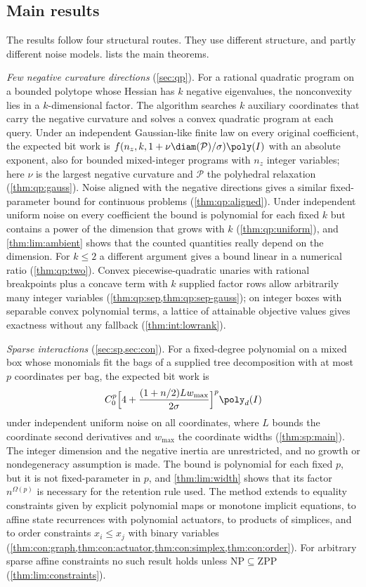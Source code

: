 \subsection{Main results}\label{sec:intro:results}

The results follow four structural routes. They use different structure,
and partly different noise models.  lists the main
theorems.

\emph{Few negative curvature directions} (\cref{sec:qp}). For a rational
quadratic program on a bounded polytope whose Hessian has $k$ negative
eigenvalues, the nonconvexity lies in a $k$-dimensional factor. The
algorithm searches $k$ auxiliary coordinates that carry the negative
curvature and solves a convex quadratic program at each query. Under an
independent Gaussian-like finite law on every original coefficient, the
expected bit work is $f(n_z,k,1+\nu\diam(\mathcal P)/\sigma)\poly(I)$ with an
absolute exponent, also for bounded mixed-integer programs with $n_z$
integer variables; here $\nu$ is the largest negative curvature and
$\mathcal P$ the polyhedral relaxation (\cref{thm:qp:gauss}). Noise aligned
with the negative directions gives a similar fixed-parameter bound for
continuous problems (\cref{thm:qp:aligned}). Under independent uniform noise
on every coefficient the bound is polynomial for each fixed $k$ but contains
a power of the dimension that grows with $k$ (\cref{thm:qp:uniform}), and
\cref{thm:lim:ambient} shows that the counted quantities really depend on
the dimension. For $k\le2$ a different argument gives a bound linear in a
numerical ratio (\cref{thm:qp:two}). Convex piecewise-quadratic unaries with
rational breakpoints plus a concave term with $k$ supplied factor rows allow
arbitrarily many integer variables
(\cref{thm:qp:sep,thm:qp:sep-gauss}); on integer boxes with separable convex
polynomial terms, a lattice of attainable objective values gives exactness
without any fallback (\cref{thm:int:lowrank}).

\emph{Sparse interactions} (\cref{sec:sp,sec:con}). For a fixed-degree
polynomial on a mixed box whose monomials fit the bags of a supplied tree
decomposition with at most $p$ coordinates per bag, the expected bit work is
\[
 C_0^p\Bigl[4+\frac{(1+n/2)Lw_{\max}}{2\sigma}\Bigr]^p\poly_d(I)
\]
under independent uniform noise on all coordinates, where $L$ bounds the
coordinate second derivatives and $w_{\max}$ the coordinate widths
(\cref{thm:sp:main}). The integer dimension and the negative inertia are
unrestricted, and no growth or nondegeneracy assumption is made. The bound is
polynomial for each fixed $p$, but it is not fixed-parameter in $p$, and
\cref{thm:lim:width} shows that its factor $n^{\Omega(p)}$ is necessary for
the retention rule used. The method extends to equality constraints given by
explicit polynomial maps or monotone implicit equations, to affine state
recurrences with polynomial actuators, to products of simplices, and to
order constraints $x_i\le x_j$ with binary variables
(\cref{thm:con:graph,thm:con:actuator,thm:con:simplex,thm:con:order}). For
arbitrary sparse affine constraints no such result holds unless
$\mathrm{NP}\subseteq\mathrm{ZPP}$ (\cref{thm:lim:constraints}).

